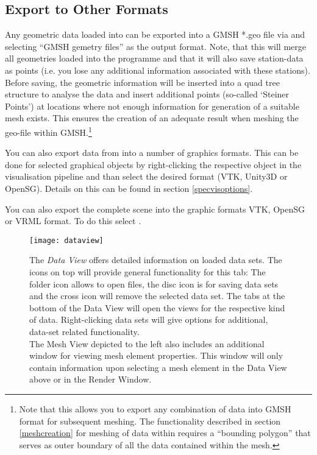 \subsection{Export to Other Formats}

Any geometric data loaded into \ogs can be exported into a GMSH *.geo file via  and selecting ``GMSH gemetry files'' as the output format. Note, that this will merge all geometries loaded into the programme and that it will also save station-data as points (i.e. you lose any additional information associated with these stations). Before saving, the geometric information will be inserted into a quad tree structure to analyse the data and insert additional points (so-called `Steiner Points') at locations where not enough information for generation of a suitable mesh exists. This ensures the creation of an adequate result when meshing the geo-file within GMSH.\footnote{Note that this allows you to export any combination of data into GMSH format for subsequent meshing. The functionality described in section \ref{meshcreation} for meshing of data within \ogs requires a ``bounding polygon'' that serves as outer boundary of all the data contained within the mesh.}

\bigskip

You can also export data from \ogs into a number of graphics formats. This can be done for selected graphical objects by right-clicking the respective object in the visualisation pipeline and than select the desired format (VTK, Unity3D or OpenSG). Details on this can be found in section \ref{specvisoptions}.

You can also export the complete scene into the graphic formats VTK, OpenSG or VRML format. To do this select .

\begin{figure}[tb]
\parbox[b]{.45\linewidth}{
    \texttt{[image: dataview]}
}
\parbox[b]{.55\linewidth}{
    \caption{The \emph{Data View} offers detailed information on loaded data sets. The icons on top will provide general functionality for this tab: The folder icon allows to open files, the disc icon is for saving data sets and the cross icon will remove the selected data set. The tabs at the bottom of the Data View will open the views for the respective kind of data. Right-clicking data sets will give options for additional, data-set related functionality.\\
    The Mesh View depicted to the left also includes an additional window for viewing mesh element properties. This window will only contain information upon selecting a mesh element in the Data View above or in the Render Window. \label{fig:dataview}}
}
\end{figure}

